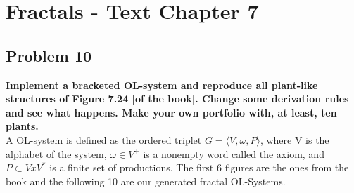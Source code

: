 
\chapter{Fractals - Text Chapter 7}

\section{Problem 10}
\textbf{ Implement a bracketed OL-system and reproduce all plant-like structures of Figure 7.24 [of the book]. Change some derivation rules and see what happens. Make your own portfolio with, at least, ten plants. }
\\
A OL-system is defined as the ordered triplet $G = \langle V, \omega, P \rangle$, where V is the alphabet of the system, $\omega \in V^{+}$ is a nonempty word called the axiom, and $P \subset V x V^{*}$ is a finite set of productions. The first 6 figures are the ones from the book and the following 10 are our generated fractal OL-Systems.
